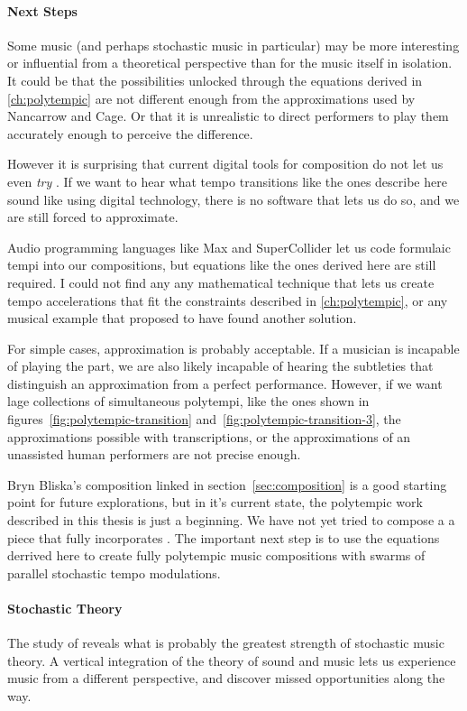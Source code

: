 \paragraph{Next Steps} Some music (and perhaps stochastic music in
particular) may be more interesting or influential from a theoretical
perspective than for the music itself in isolation. It could be that
the possibilities unlocked through the equations derived in
\autoref{ch:polytempic} are not different enough from the
approximations used by Nancarrow and Cage. Or that it is unrealistic
to direct performers to play them accurately enough to perceive the
difference.

However it is surprising that current digital tools for composition do
not let us even \emph{try} \polytempic. If we want to hear what tempo
transitions like the ones describe here sound like using digital
technology, there is no software that lets us do so, and we are still
forced to approximate. 

Audio programming languages like Max and SuperCollider let us code
formulaic tempi into our compositions, but equations like the ones
derived here are still required. I could not find any any mathematical
technique that lets us create tempo accelerations that fit the
constraints described in \autoref{ch:polytempic}, or any musical
example that proposed to have found another solution.

For simple cases, approximation is probably acceptable. If a musician
is incapable of playing the part, we are also likely incapable of
hearing the subtleties that distinguish an approximation from a
perfect performance. However, if we want lage collections of
simultaneous polytempi, like the ones shown in
figures~\ref{fig:polytempic-transition}
and~\ref{fig:polytempic-transition-3}, the approximations possible
with transcriptions, or the approximations of an unassisted human
performers are not precise enough.

Bryn Bliska's composition linked in section~\ref{sec:composition} is a
good starting point for future explorations, but in it's current
state, the polytempic work described in this thesis is just a
beginning. We have not yet tried to compose a a piece that fully
incorporates \polytempic. The important next step is to use the
equations derrived here to create fully polytempic music compositions
with swarms of parallel stochastic tempo modulations.

\paragraph{Stochastic Theory} The study of \polytempic reveals what is
probably the greatest strength of stochastic music theory. A vertical
integration of the theory of sound and music lets us experience music
from a different perspective, and discover missed opportunities along the
way. 

